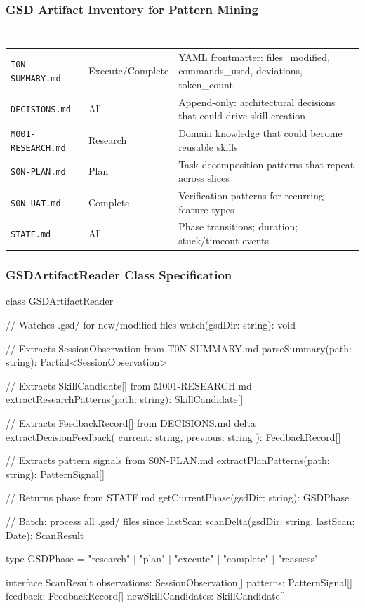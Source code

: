 \documentclass[11pt,letterpaper]{article}
\newcommand{\tableheader}[1]{\textbf{\sffamily\textcolor{white}{#1}}}
\begin{document}
\subsubsection{GSD Artifact Inventory for Pattern Mining}

\begin{center}
\begin{tabularx}{\textwidth}{L{3.5cm}L{2cm}X}
\toprule
{}
\tableheader{Artifact} & \tableheader{Phase} & \tableheader{Pattern Signal} \\
\midrule
\texttt{T0N-SUMMARY.md} & Execute/Complete & YAML frontmatter: files\_modified, commands\_used, deviations, token\_count \\
\texttt{DECISIONS.md} & All & Append-only: architectural decisions that could drive skill creation \\
\texttt{M001-RESEARCH.md} & Research & Domain knowledge that could become reusable skills \\
\texttt{S0N-PLAN.md} & Plan & Task decomposition patterns that repeat across slices \\
\texttt{S0N-UAT.md} & Complete & Verification patterns for recurring feature types \\
\texttt{STATE.md} & All & Phase transitions; duration; stuck/timeout events \\
\bottomrule
\end{tabularx}
\end{center}

\subsubsection{GSDArtifactReader Class Specification}

\begin{asciibox}
class GSDArtifactReader {
  // Watches .gsd/ for new/modified files
  watch(gsdDir: string): void

  // Extracts SessionObservation from T0N-SUMMARY.md
  parseSummary(path: string): Partial<SessionObservation>

  // Extracts SkillCandidate[] from M001-RESEARCH.md
  extractResearchPatterns(path: string): SkillCandidate[]

  // Extracts FeedbackRecord[] from DECISIONS.md delta
  extractDecisionFeedback(
    current: string,
    previous: string
  ): FeedbackRecord[]

  // Extracts pattern signals from S0N-PLAN.md
  extractPlanPatterns(path: string): PatternSignal[]

  // Returns phase from STATE.md
  getCurrentPhase(gsdDir: string): GSDPhase

  // Batch: process all .gsd/ files since lastScan
  scanDelta(gsdDir: string, lastScan: Date): ScanResult
}

type GSDPhase = "research" | "plan" | "execute" | "complete" | "reassess"

interface ScanResult {
  observations: SessionObservation[]
  patterns: PatternSignal[]
  feedback: FeedbackRecord[]
  newSkillCandidates: SkillCandidate[]
}
\end{asciibox}
\end{document}
